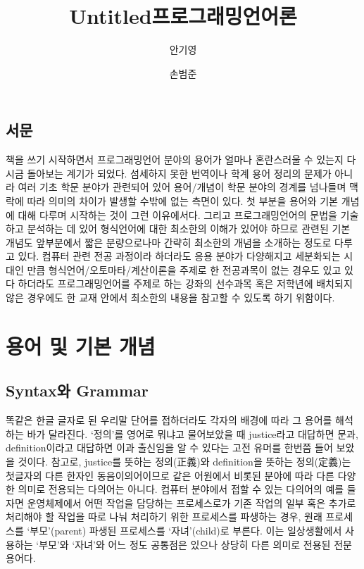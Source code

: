 \documentclass[b5paper,chapter,figtabcapt]{oblivoir}
\title{Untitled}
\title{프로그래밍언어론}
\author{안기영 \and 손범준}
\begin{document}
\maketitle

\frontmatter 

\chapter*{서문}
책을 쓰기 시작하면서 프로그래밍언어 분야의 용어가 얼마나 혼란스러울 수 있는지
다시금 돌아보는 계기가 되었다. 섬세하지 못한 번역이나 학계 용어 정리의 문제가
아니라 여러 기초 학문 분야가 관련되어 있어 용어/개념이 학문 분야의 경계를
넘나들며 맥락에 따라 의미의 차이가 발생할 수밖에 없는 측면이 있다. 첫 부분을
용어와 기본 개념에 대해 다루며 시작하는 것이 그런 이유에서다. 그리고
프로그래밍언어의 문법을 기술하고 분석하는 데 있어 형식언어에 대한 최소한의
이해가 있어야 하므로 관련된 기본 개념도 앞부분에서 짧은 분량으로나마
간략히 최소한의 개념을 소개하는 정도로 다루고 있다. 컴퓨터 관련
전공 과정이라 하더라도 응용 분야가 다양해지고 세분화되는 시대인 만큼
형식언어/오토마타/계산이론을 주제로 한 전공과목이 없는 경우도 있고
있다 하더라도 프로그래밍언어를 주제로 하는 강좌의 선수과목 혹은
저학년에 배치되지 않은 경우에도 한 교재 안에서 최소한의 내용을
참고할 수 있도록 하기 위함이다.

\newpage

\tableofcontents

\mainmatter

\part{용어 및 기본 개념}

\chapter{Syntax와 Grammar}

똑같은 한글 글자로 된 우리말 단어를 접하더라도 각자의 배경에 따라
그 용어를 해석하는 바가 달라진다. `정의'를 영어로 뭐냐고 물어보았을 때
justice라고 대답하면 문과, definition이라고 대답하면 이과 출신임을
알 수 있다는 고전 유머를 한번쯤 들어 보았을 것이다. 참고로, 
justice를 뜻하는 정의(正義)와 definition을 뜻하는 정의(定義)는
첫글자의 다른 한자인 동음이의어이므로 같은 어원에서 비롯된
분야에 따라 다른 다양한 의미로 전용되는 다의어는 아니다.
컴퓨터 분야에서 접할 수 있는 다의어의 예를 들자면 운영체제에서
어떤 작업을 담당하는 프로세스로가 기존 작업의 일부 혹은 추가로
처리해야 할 작업을 따로 나눠 처리하기 위한 프로세스를 파생하는 경우,
원래 프로세스를 `부모'(parent) 파생된 프로세스를 `자녀'(child)로 부른다.
이는 일상생활에서 사용하는 `부모'와 `자녀'와 어느 정도 공통점은 있으나
상당히 다른 의미로 전용된 전문용어다.
\end{document}
